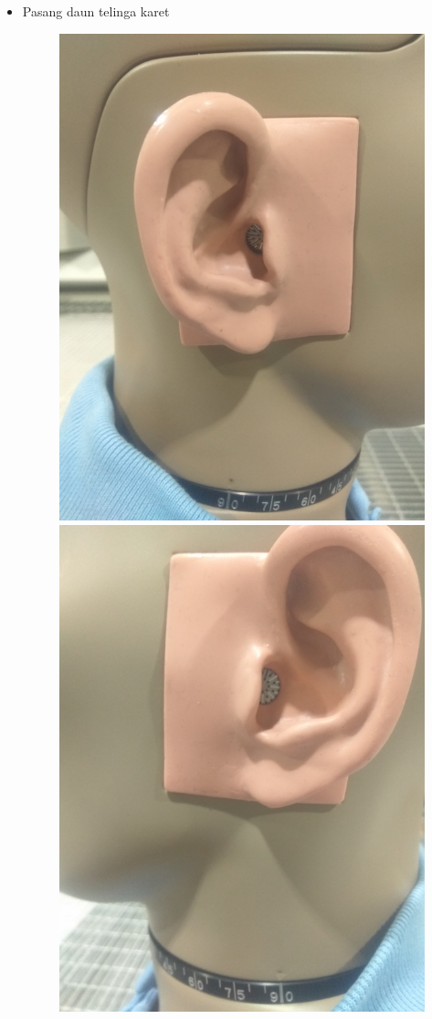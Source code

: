 \documentclass[12pt,]{article}
\begin{document}
\begin{itemize}
		\newpage
		\item Pasang daun telinga karet
		\begin{figure}[H]
			\centering
			\includegraphics[width=0.3\linewidth]{day_1/earleaf1}
			\includegraphics[width=0.3\linewidth]{day_1/earleaf2}
		\end{figure}


\end{itemize}
\end{document}
